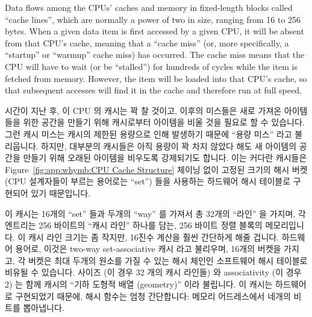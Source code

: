 Data flows among the CPUs' caches and memory in fixed-length blocks
called ``cache lines'', which are normally a power of two in size,
ranging from 16 to 256 bytes.
When a given data item is first accessed by a given CPU, it will
be absent from that CPU's cache, meaning that a ``cache miss''
(or, more specifically, a ``startup'' or ``warmup'' cache miss)
has occurred.
The cache miss means that the CPU will
have to wait (or be ``stalled'') for hundreds of cycles while the
item is fetched from memory.
However, the item will be loaded into that CPU's cache, so that
subsequent accesses will find it in the cache and therefore run
at full speed.
\fi

시간이 지난 후, 이 CPU 의 캐시는 꽉 찰 것이고, 이후의 미스들은 새로 가져온
아이템들을 위한 공간을 만들기 위해 캐시로부터 아이템을 비울 것을 필요로 할 수
있습니다.
그런 캐시 미스는 캐시의 제한된 용량으로 인해 발생하기 때문에 ``용량 미스'' 라고
불리웁니다.
하지만, 대부분의 캐시들은 아직 용량이 꽉 차지 않았다 해도 새 아이템의 공간을
만들기 위해 오래된 아이템을 비우도록 강제되기도 합니다.
이는 커다란 캐시들은 Figure~\ref{fig:app:whymb:CPU Cache Structure} 체이닝 없이
고정된 크기의 해시 버켓 (CPU 설계자들이 부르는 용어로는 ``set'') 들을 사용하는
하드웨어 해시 테이블로 구현되어 있기 때문입니다.

이 캐시는 16개의 ``set'' 들과 두개의 ``way'' 를 가져서 총 32개의 ``라인'' 을
가지며, 각 엔트리는 256 바이트의 ``캐시 라인'' 하나를 담는, 256 바이트 정렬
블록의 메모리입니다.
이 캐시 라인 크기는 좀 작지만, 16진수 계산을 훨씬 간단하게 해줄 겁니다.
하드웨어 용어로, 이것은 two-way set-associative 캐시 라고 불리우며, 16개의
버켓을 가지고, 각 버켓은 최대 두개의 원소를 가질 수 있는 해시 체인인 소프트웨어
해시 테이블로 비유될 수 있습니다.
사이즈 (이 경우 32 개의 캐시 라인들) 와 associativity (이 경우 2) 는 함께
캐시의 ``기하 도형적 배열 (geometry)'' 이라 불립니다.
이 캐시는 하드웨어로 구현되었기 때문에, 해시 함수는 엄청 간단합니다: 메모리
어드레스에서 네개의 비트를 뽑아냅니다.
\iffalse

